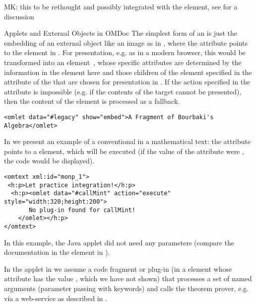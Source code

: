 \begin{module}[id=ext]
\begin{omgroup}[id=ext,short=Auxiliary Elements]
\begin{oldpart}{MK: this to be rethought and possibly integrated with the
     element, see  for a discussion}
\begin{omgroup}[id=applets]{Applets and External Objects in OMDoc}
The simplest form of an  is just the embedding of an external object like
an image as in {}, where the  attribute
points to the  element in {}. For presentation,
e.g. as {\xhtml} in a modern browser, this would be transformed into an
 element~\cite{W3C:xhtml2000}, whose specific attributes
are determined by the information in the  element here and those
 children of the  element specified in the
 attribute of the  that are chosen for
presentation in {\xhtml}. If the action specified in the 
attribute is impossible (e.g. if the contents of the  target
cannot be presented), then the content of the  element is processed as a
fallback.

\begin{lstlisting}[label=lst:omlet-image,
  caption={An \element{omlet} for an Image},index={omlet}]
<omlet data="#legacy" show="embed">A Fragment of Bourbaki's Algebra</omlet>
\end{lstlisting}

In {} we present an example of a conventional
{} in a mathematical text: the 
attribute points to a  element, which will be executed (if the
value of the  attribute were
, the code would be displayed).

\begin{lstlisting}[label=lst:omlet1,
  caption={An \element{omlet} that Calls the Java Applet from {\mylstref{callMint}}.},
  index={omlet}]
<omtext xml:id="monp_1">    
 <h:p>Let practice integration!</h:p>
  <h:p><omlet data="#callMint" action="execute" style="width:320;height:200">
       No plug-in found for callMint!
    </omlet></h:p>
</omtext>
\end{lstlisting}

In this example, the Java applet did not need any parameters (compare the
documentation in the  element in {}). 

In the applet in {} we assume a code fragment or plug-in (in a
 element whose  attribute has the value
{}, which we have not shown) that processes a set of named arguments
(parameter passing with keywords) and calls the theorem prover, e.g. via a web-service as
described in {}.


\end{omgroup}
\end{oldpart}
\end{omgroup}
\end{module}
